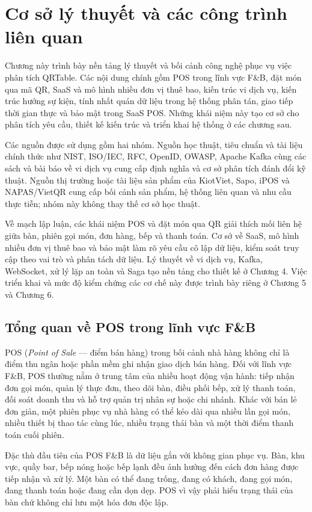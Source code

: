 \chapter{Cơ sở lý thuyết và các công trình liên quan}

Chương này trình bày nền tảng lý thuyết và bối cảnh công nghệ phục vụ việc phân tích QRTable. Các nội dung chính gồm POS trong lĩnh vực F\&B, đặt món qua mã QR, SaaS và mô hình nhiều đơn vị thuê bao, kiến trúc vi dịch vụ, kiến trúc hướng sự kiện, tính nhất quán dữ liệu trong hệ thống phân tán, giao tiếp thời gian thực và bảo mật trong SaaS POS. Những khái niệm này tạo cơ sở cho phân tích yêu cầu, thiết kế kiến trúc và triển khai hệ thống ở các chương sau.

Các nguồn được sử dụng gồm hai nhóm. Nguồn học thuật, tiêu chuẩn và tài liệu chính thức như NIST, ISO/IEC, RFC, OpenID, OWASP, Apache Kafka cùng các sách và bài báo về vi dịch vụ cung cấp định nghĩa và cơ sở phân tích đánh đổi kỹ thuật. Nguồn thị trường hoặc tài liệu sản phẩm của KiotViet, Sapo, iPOS và NAPAS/VietQR cung cấp bối cảnh sản phẩm, hệ thống liên quan và nhu cầu thực tiễn; nhóm này không thay thế cơ sở học thuật.

Về mạch lập luận, các khái niệm POS và đặt món qua QR giải thích mối liên hệ giữa bàn, phiên gọi món, đơn hàng, bếp và thanh toán. Cơ sở về SaaS, mô hình nhiều đơn vị thuê bao và bảo mật làm rõ yêu cầu cô lập dữ liệu, kiểm soát truy cập theo vai trò và phân tách dữ liệu. Lý thuyết về vi dịch vụ, Kafka, WebSocket, xử lý lặp an toàn và Saga tạo nền tảng cho thiết kế ở Chương 4. Việc triển khai và mức độ kiểm chứng các cơ chế này được trình bày riêng ở Chương 5 và Chương 6.

\section{Tổng quan về POS trong lĩnh vực F\&B}

POS (\textit{Point of Sale} — điểm bán hàng) trong bối cảnh nhà hàng không chỉ là điểm thu ngân hoặc phần mềm ghi nhận giao dịch bán hàng. Đối với lĩnh vực F\&B, POS thường nằm ở trung tâm của nhiều hoạt động vận hành: tiếp nhận đơn gọi món, quản lý thực đơn, theo dõi bàn, điều phối bếp, xử lý thanh toán, đối soát doanh thu và hỗ trợ quản trị nhân sự hoặc chi nhánh. Khác với bán lẻ đơn giản, một phiên phục vụ nhà hàng có thể kéo dài qua nhiều lần gọi món, nhiều thiết bị thao tác cùng lúc, nhiều trạng thái bàn và một thời điểm thanh toán cuối phiên.

Đặc thù đầu tiên của POS F\&B là dữ liệu gắn với không gian phục vụ. Bàn, khu vực, quầy bar, bếp nóng hoặc bếp lạnh đều ảnh hưởng đến cách đơn hàng được tiếp nhận và xử lý. Một bàn có thể đang trống, đang có khách, đang gọi món, đang thanh toán hoặc đang cần dọn dẹp. POS vì vậy phải hiểu trạng thái của bàn chứ không chỉ lưu một hóa đơn độc lập.

